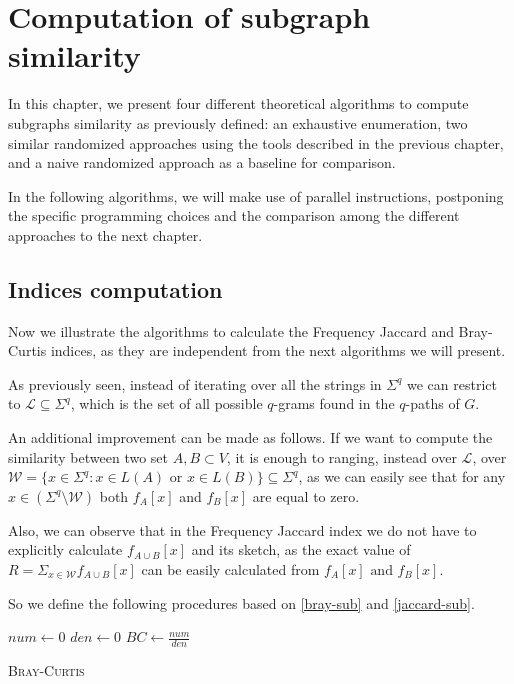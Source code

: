\chapter{Computation of subgraph similarity}

In this chapter, we present four different theoretical algorithms to compute subgraphs similarity as previously defined: an exhaustive enumeration, two similar randomized approaches using the tools described in the previous chapter, and a naive randomized approach as a baseline for comparison.\medskip
	
In the following algorithms, we will make use of parallel instructions, postponing the specific programming choices and the comparison among the different approaches to the next chapter.
	
\section{Indices computation}

Now we illustrate the algorithms to calculate the Frequency Jaccard and Bray-Curtis indices, as they are independent from the next algorithms we will present.\bigskip

As previously seen, instead of iterating over all the strings in $\Sigma^{q}$ we can restrict to $\mathcal{L} \subseteq \Sigma^{q}$, which is the set of all possible $q$-grams found in the $q$-paths of $G$.\medskip 

An additional improvement can be made as follows. If we want to compute the similarity between two set $A, B \subset V$, it is enough to ranging, instead over $\mathcal{L}$, over $\mathcal{W} = \{ x \in \Sigma^{q} : x \in L(A) \text{ or } x \in L(B) \} \subseteq \Sigma^{q}$, as we can easily see that for any $x \in ( \Sigma^{q} \setminus \mathcal{W} )$ both $f_A[x]$ and $f_B[x]$ are equal to zero.\bigskip

Also, we can observe that in the Frequency Jaccard index we do not have to explicitly calculate $f_{A \cup B}[x]$ and its sketch, as the exact value of $R = \Sigma_{x \in \mathcal{W}} f_{A \cup B}[x]$ can be easily calculated from $f_{A}[x] \text{ and } f_{B}[x]$.\bigskip

So we define the following procedures based on \eqref{bray-sub} and \eqref{jaccard-sub}.\medskip

\begin{algorithm}[h]
	\small
	\DontPrintSemicolon
	\BlankLine
	$num \gets 0$\;
	$den \gets 0$\;
	$BC \gets \frac{num}{den}$\;
	\caption{\textsc{Bray-Curtis}}
	\label{alg:bray-curtis}
\end{algorithm}

